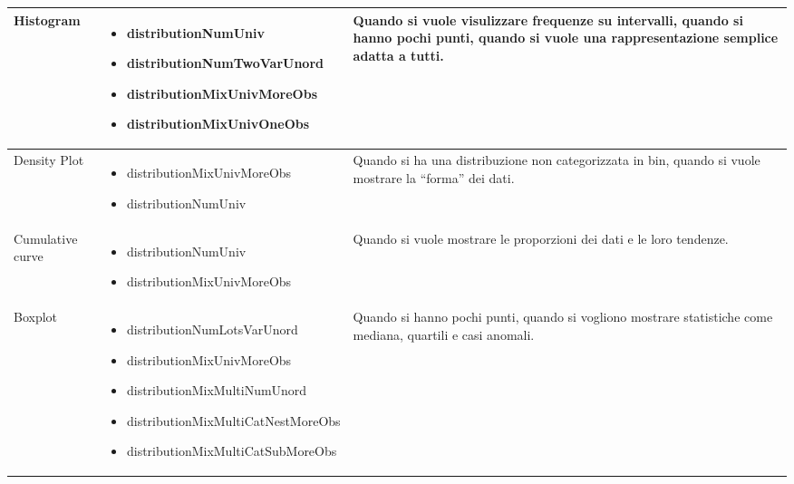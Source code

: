 \begin{xltabular}{\columnwidth}{|p{0.15\columnwidth}|X|p{0.27\columnwidth}|}
    \hline
    Histogram & 
    \vspace{-3.5mm}
    \begin{itemize}[noitemsep,topsep=0pt, left=0pt]
        \item distributionNumUniv
        \item distributionNumTwoVarUnord
        \item distributionMixUnivMoreObs
        \item distributionMixUnivOneObs
    \end{itemize} & 
    Quando si vuole visulizzare frequenze su intervalli, quando si hanno pochi punti, quando si vuole una rappresentazione semplice adatta a tutti. \\
    \hline
    Density Plot & 
    \vspace{-3.5mm}
    \begin{itemize}[noitemsep,topsep=0pt, left=0pt]
        \item distributionMixUnivMoreObs
        \item distributionNumUniv
    \end{itemize} & 
    Quando si ha una distribuzione non categorizzata in bin, quando si vuole mostrare la ``forma'' dei dati. \\
    \hline
    Cumulative curve & 
    \vspace{-3.5mm}
    \begin{itemize}[noitemsep,topsep=0pt, left=0pt]
        \item distributionNumUniv
        \item distributionMixUnivMoreObs
    \end{itemize} & 
    Quando si vuole mostrare le proporzioni dei dati e le loro tendenze. \\
    \hline
    Boxplot & 
    \vspace{-3.5mm}
    \begin{itemize}[noitemsep,topsep=0pt, left=0pt]
        \item distributionNumLotsVarUnord
        \item distributionMixUnivMoreObs
        \item distributionMixMultiNumUnord
        \item distributionMixMultiCatNestMoreObs
        \item distributionMixMultiCatSubMoreObs
    \end{itemize} & 
    Quando si hanno pochi punti, quando si vogliono mostrare statistiche come mediana, quartili e casi anomali. \\

\end{xltabular}
